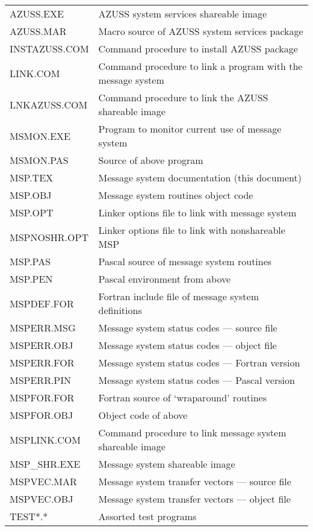 \begin{tabular}{|l|l|}    \hline
AZUSS.EXE      &   AZUSS system services shareable image    \\
AZUSS.MAR      &   Macro source of AZUSS system services package   \\
INSTAZUSS.COM   &  Command procedure to install AZUSS package  \\
LINK.COM        &  Command procedure to link a program with the message system\\
LNKAZUSS.COM    &  Command procedure to link the AZUSS shareable image \\
MSMON.EXE       &  Program to monitor current use of message system \\
MSMON.PAS      &   Source of above program  \\
MSP.TEX        &   Message system documentation (this document) \\
MSP.OBJ        &   Message system routines object code \\
MSP.OPT       &    Linker options file to link with message system  \\       
MSPNOSHR.OPT  &    Linker options file to link with nonshareable MSP \\
MSP.PAS       &    Pascal source of message system routines  \\
MSP.PEN       &    Pascal environment from above \\
MSPDEF.FOR    &    Fortran include file of message system definitions  \\
MSPERR.MSG    &    Message system status codes --- source file \\
MSPERR.OBJ    &    Message system status codes --- object file \\
MSPERR.FOR    &    Message system status codes --- Fortran version \\
MSPERR.PIN    &    Message system status codes --- Pascal version \\
MSPFOR.FOR    &    Fortran source of `wraparound' routines \\
MSPFOR.OBJ    &    Object code of above  \\
MSPLINK.COM   &    Command procedure to link message system shareable image \\
MSP\_SHR.EXE    &    Message system shareable image \\
MSPVEC.MAR    &    Message system transfer vectors --- source file \\
MSPVEC.OBJ    &    Message system transfer vectors --- object file \\
TEST*.*       &    Assorted test programs   \\    \hline
\end{tabular}


